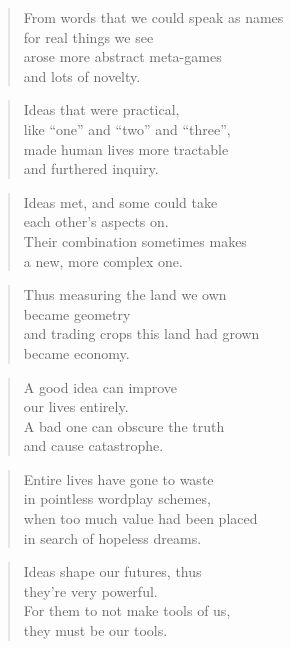 \documentclass[10pt,a4paper]{article}
\begin{document}
\begin{paracol}{2}
\begin{verse}
From words that we could speak as names\\
for real things we see\\
arose more abstract meta-games\\
and lots of novelty.
\end{verse}

\begin{verse}
Ideas that were practical,\\
like “one” and “two” and “three”,\\
made human lives more tractable\\
and furthered inquiry.
\end{verse}

\begin{verse}
Ideas met, and some could take\\
each other’s aspects on.\\
Their combination sometimes makes\\
a new, more complex one.
\end{verse}

\begin{verse}
Thus measuring the land we own\\
became geometry\\
and trading crops this land had grown\\
became economy.
\end{verse}

\begin{verse}
A good idea can improve\\
our lives entirely.\\
A bad one can obscure the truth\\
and cause catastrophe.
\end{verse}

\begin{verse}
Entire lives have gone to waste\\
in pointless wordplay schemes,\\
when too much value had been placed\\
in search of hopeless dreams.
\end{verse}

\begin{verse}
Ideas shape our futures, thus\\
they’re very powerful.\\
For them to not make tools of us,\\
they must be our tools.
\end{verse}


\end{paracol}
\end{document}
